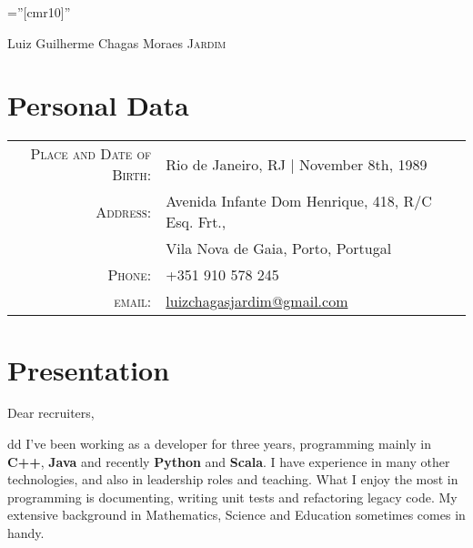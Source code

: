 \documentclass[a4paper,10pt]{article}
\newcommand{\cvtype}{d}
\begin{document}

\pagestyle{empty} %

\font\fb=''[cmr10]'' %

\par{\centering
		{\Huge Luiz Guilherme Chagas Moraes \textsc{Jardim}
	}\bigskip\par}

\section{Personal Data}

\begin{tabular}{rl}
    \textsc{Place and Date of Birth:} & Rio de Janeiro, RJ  | November 8th, 1989 \\
    \textsc{Address:}   & Avenida Infante Dom Henrique, 418, R/C Esq. Frt.,\\& Vila Nova de Gaia, Porto, Portugal \\
    \textsc{Phone:}     & +351 910 578 245\\
    \textsc{email:}     & \href{mailto:luizchagasjardim@gmail.com}{luizchagasjardim@gmail.com} \\
\end{tabular}

\section{Presentation}
Dear recruiters,

\if \cvtype d
{\quad}I've been working as a developer for three years, programming mainly in \textbf{C++}, \textbf{Java} and recently \textbf{Python} and \textbf{Scala}. I have experience in many other technologies, and also in leadership roles and teaching. What I enjoy the most in programming is documenting, writing unit tests and refactoring legacy code. My extensive background in Mathematics, Science and Education sometimes comes in handy.
\end{document}
